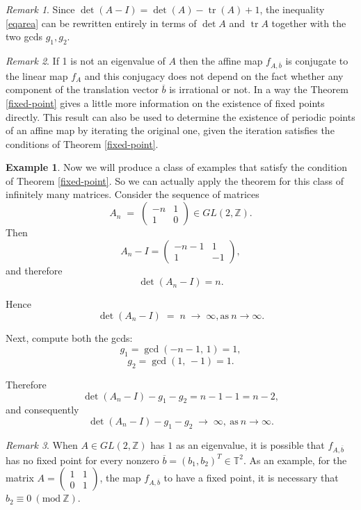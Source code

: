 \documentclass[12pt]{amsart}
\theoremstyle{plain}
\theoremstyle{definition}
\newtheorem{example}[theorem]{Example}
\theoremstyle{remark}
\newtheorem{remark}{Remark}
\begin{document}
\begin{remark}
 Since $ \det(A-I)=\det(A)-\operatorname{tr}(A)+1$, the inequality
      \eqref{eqarea} can be rewritten entirely in terms of $ \det A$ 
      and $ \operatorname{tr}A$  together with the two gcds $ g_1,g_2$.
\end{remark}

\begin{remark}
If 1 is not an eigenvalue of $A$ then the affine map $ f_{A,\overline{b}}$ is conjugate to the linear map $f_A$ and this conjugacy does not depend on the fact whether any component of the translation vector $\overline{b}$ is irrational or not. In a way the Theorem \ref{fixed-point} gives a little more information on the existence of fixed points directly. This result can also be used to determine the existence of periodic points of an affine map by iterating the original one, given the iteration satisfies the conditions of Theorem \ref{fixed-point}.         
\end{remark}


\begin{example}
    Now we will produce a class of examples  that satisfy the condition of Theorem \ref{fixed-point}. So we can actually  apply the theorem for this class of infinitely many matrices. Consider the sequence of matrices
\[
A_n \;=\;
\begin{pmatrix}
-n & 1 \\[6pt]
1 & 0
\end{pmatrix}
\in GL(2,\mathbb{Z}).
\]
Then
\[
A_n - I
=
\begin{pmatrix}
-n-1 & 1 \\[6pt]
1 & -1
\end{pmatrix},
\]
and therefore
\[
\det(A_n - I)
=n.
\]

Hence
\[
\det(A_n - I) \;=\; n \;\to\; \infty, \text{as} ~n\to \infty.
\]

Next, compute both the gcds:
\[
g_1=\gcd(-n - 1,\, 1)= 1,
\]
\[
g_2=\gcd(1,\, -1)= 1.
\]

Therefore
\[
\det(A_n - I) - g_1- g_2=n - 1 - 1=n - 2,
\]
and consequently
\[
\det(A_n - I) - g_1 - g_2
\;\to\;
\infty, ~\text{as}~n\to \infty.
\]

\end{example}

\begin{remark}
When $A\in  GL(2,\mathbb{Z})$ has $1$ as an eigenvalue, it is possible that $f_{A,\overline{b}}$ has no fixed point for every nonzero $\overline{b}=(b_1,b_2)^T\in \mathbb{T}^2.$ As an example, for the matrix  $
A = \begin{pmatrix} 1 & 1 \\ 0 & 1 \end{pmatrix}
$, the map $f_{A,\overline{b}}$ to have a fixed point, it is necessary that $b_2\equiv 0 ~(\text{mod}~\mathbb{Z}).$ 
\end{remark}
\end{document}
